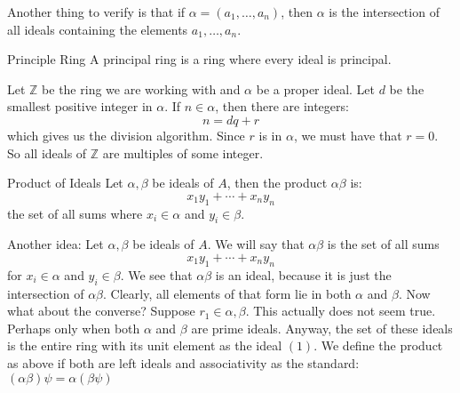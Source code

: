 \documentclass{report}
\begin{document}
Another thing to verify is that if $\alpha = (a_{1}, \ldots, a_{n})$, then $\alpha$ is the intersection of all ideals containing the elements $a_{1}, \ldots, a_{n}$.

\begin{definition}{Principle Ring}
    A principal ring is a ring where every ideal is principal.
\end{definition}

\begin{examples}
    \begin{example}
        Let $\mathbb{Z}$ be the ring we are working with and $\alpha$ be a proper ideal. Let $d$ be the smallest positive integer in $\alpha$. If $n \in \alpha$, then there are integers:
            \begin{equation*}
                n = dq + r
            \end{equation*}
        which gives us the division algorithm. Since $r$ is in $\alpha$, we must have that $r = 0$. So all ideals of $\mathbb{Z}$ are multiples of some integer.
    \end{example}
\end{examples}

\begin{definition}{Product of Ideals}
    Let $\alpha, \beta$ be ideals of $A$, then the product $\alpha\beta$ is:
        \begin{equation*}
            x_{1}y_{1} + \cdots + x_{n}y_{n}
        \end{equation*}
    the set of all sums where $x_{i} \in \alpha$ and $y_{i} \in \beta$.
\end{definition}

Another idea: Let $\alpha, \beta$ be ideals of $A$. We will say that $\alpha\beta$ is the set of all sums
    \begin{equation*}
        x_{1}y_{1} + \cdots + x_{n}y_{n}
    \end{equation*} 
for $x_{i} \in \alpha$ and $y_{i} \in \beta$. We see that $\alpha\beta$ is an ideal, because it is just the intersection of $\alpha\beta$. Clearly, all elements of that form lie in both $\alpha$ and $\beta$. Now what about the converse? Suppose $r_{1} \in \alpha, \beta$. This actually does not seem true. Perhaps only when both $\alpha$ and $\beta$ are prime ideals. Anyway, the set of these ideals is the entire ring with its unit element as the ideal $(1)$. We define the product as above if both are left ideals and associativity as the standard: $(\alpha\beta)\psi = \alpha(\beta\psi)$
\end{document}
